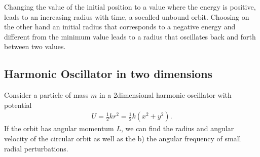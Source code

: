 \documentclass[letterpaper,10pt,english]{sphinxmanual}
\begin{document}
\begin{sphinxVerbatim}[commandchars=\\\{\}]
    \PYG{p}{[}\PYG{p}{]}  \PYG{p}{[}\PYG{p}{]}  
    \PYG{p}{[}\PYG{p}{]}  \PYG{p}{[}\PYG{p}{]}  
   
\PYG{p}{[}\PYG{p}{]}
\PYG{p}{[}\PYG{p}{]}
\PYG{p}{[}\PYG{p}{]}
\PYG{p}{[}\PYG{p}{]}
\PYG{p}{[}\PYG{p}{]}
\PYG{p}{[}\PYG{p}{]}
\end{sphinxVerbatim}

Changing the value of the initial position to a value where the energy is positive, leads to an increasing radius with time, a so\sphinxhyphen{}called unbound orbit. Choosing on the other hand an initial radius that corresponds to a negative energy and different from the minimum value leads to a radius that oscillates back and forth between two values.


\subsection{Harmonic Oscillator in two dimensions}
\label{\detokenize{chapter1:harmonic-oscillator-in-two-dimensions}}
Consider a particle of mass \(m\) in a 2\sphinxhyphen{}dimensional harmonic oscillator with potential
\begin{equation*}
\begin{split}
U=\frac{1}{2}kr^2=\frac{1}{2}k(x^2+y^2).
\end{split}
\end{equation*}
If the orbit has angular momentum \(L\), we can find the radius and angular velocity of the circular orbit as well as the b) the angular frequency of small radial perturbations.
\end{document}
